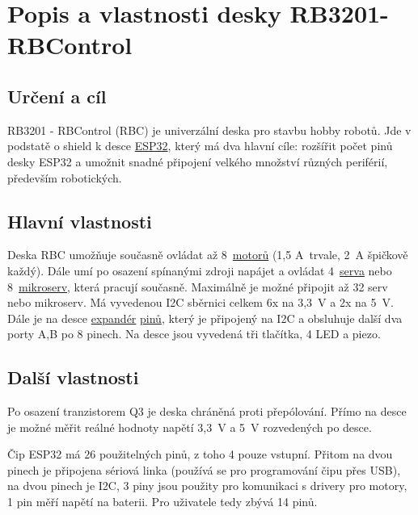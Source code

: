 



\section{Popis a vlastnosti desky RB3201-RBControl} \label{rbcontrol} 

\subsection{Určení a cíl} 

RB3201 - RBControl (RBC) je univerzální deska pro stavbu hobby robotů. 
Jde v podstatě o shield k desce  \hyperref[esp32]{ESP32}, který má dva hlavní cíle: rozšířit počet pinů desky ESP32 a umožnit snadné připojení velkého množství různých periférií, především robotických. 

\subsection{Hlavní vlastnosti } 

Deska RBC umožňuje současně ovládat až 8~\hyperref[motor]{motorů} (1,5 A~trvale, 2~A špičkově každý). 
Dále umí po osazení spínanými zdroji napájet a ovládat 4~\hyperref[servo]{serva} nebo 8~\hyperref[mikroservo]{mikroserv}, která pracují současně.
Maximálně je možné připojit až 32 serv nebo mikroserv. 
Má vyvedenou I2C sběrnici celkem 6x na 3,3~V a 2x na 5~V. 
Dále je na desce \hyperref[expander]{expandér} \hyperref[pin]{pinů}, který je připojený na I2C a obsluhuje další dva porty A,B po 8 pinech. 
Na desce jsou vyvedená tři tlačítka, 4 LED a piezo.


\subsection{Další vlastnosti }

Po osazení tranzistorem Q3 je deska chráněná proti přepólování. Přímo na desce je možné měřit reálné hodnoty napětí 3,3~V a 5~V rozvedených po desce. 

Čip ESP32 má 26 použitelných pinů, z toho 4 pouze vstupní. 
Přitom na dvou pinech je připojena sériová linka (používá se pro programování čipu přes USB), na dvou pinech je I2C, 3 piny jsou použity pro komunikaci s drivery pro motory, 1 pin měří napětí na baterii. 
Pro uživatele tedy zbývá 14 pinů. 

